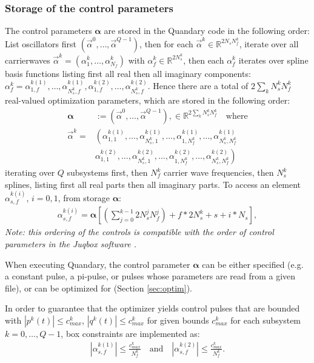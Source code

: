 \documentclass[11pt]{article}
\newcommand{\R}{\mathds{R}}
\newcommand{\bfa}{\boldsymbol{\alpha}}
\newcommand{\bs}[1]{{\boldsymbol{#1}}}
\begin{document}
\subsubsection{Storage of the control parameters}

The control parameters $\bs{\alpha}$ are stored in the Quandary code in the following order: List oscillators first $(\vec{\alpha}^0, \dots, \vec{\alpha}^{Q-1})$, then for each $\vec{\alpha}^k \in
\R^{2N_sN_f^k}$, iterate over all carrierwaves $\vec{\alpha}^k =
(\alpha^k_1,\dots, \alpha^k_{N_f})$ with $\alpha^k_f \in \R^{2N_s^k}$, then each
$\alpha^k_f$ iterates over spline basis functions listing first all real then all imaginary 
components: $\alpha^k_f = \alpha^{k(1)}_{1,f}, \dots, \alpha^{k(1)}_{N_s^k,f}, \alpha^{k(2)}_{1,f}, \dots, \alpha^{k(2)}_{N_s^k,f}$. Hence there are a total of $2\sum_k N_s^kN_f^k$ real-valued optimization parameters, which are stored in the following order:
  \begin{align}
    \boldsymbol{\alpha} &:= \left( \vec{\alpha}^0, \dots, \vec{\alpha}^{Q-1} \right), \in
    \mathds{R}^{2\sum_k N_s^k N_f^k} \quad \text{where}\\
    \vec{\alpha}^k = &\left( \alpha_{1,1}^{k(1)},\dots, \alpha_{N_s^k,1}^{k(1)}, \dots, \alpha_{1,N_f^k}^{k(1)}, \dots, \alpha_{N_s^k,N_f^k}^{k(1)} \right.\\
                   &  \left. \alpha_{1,1}^{k(2)},\dots, \alpha_{N_s^k,1}^{k(2)}, \dots, \alpha_{1,N_f^k}^{k(2)}, \dots, \alpha_{N_s^k,N_f^k}^{k(2)} \right)
  \end{align}
  iterating over $Q$ subsystems first, then $N_f^k$ carrier wave frequencies, then $N_s^k$ splines, listing first all real parts then all imaginary parts. To access an element $\alpha_{s,f}^{k(i)}$, $i=0,1$, from storage $\bfa$:
  \begin{align}
    \alpha_{s,f}^{k(i)} = \bfa[ \left(\sum_{j=0}^{k-1} 2N_s^jN_f^j\right) + f*2N_s^k + s + i*N_s ],
  \end{align}
  \textit{Note: this ordering of the controls is compatible with the order of control parameters in the Juqbox software \cite{petersson2021optimal}.}

  When executing Quandary, the control parameter $\boldsymbol{\alpha}$ can be either specified (e.g. a constant pulse, a pi-pulse, or 
  pulses whose parameters are read from a given file), or can be optimized for (Section \ref{sec:optim}). 
  
  In order to guarantee that the optimizer yields control pulses that are
  bounded with $|p^k(t)| \leq c^k_{max}$, $|q^k(t)| \leq c^k_{max}$ for given bounds $c^k_{max}$ for each  
  subsystem $k=0,\dots, Q-1$, box constraints are implemented as:
   \begin{align}
     | \alpha_{s,f}^{k(1)}| \leq \frac{c^k_{max}}{N_f^k} \quad \text{and} \quad |
     \alpha_{s,f}^{k(2)} | \leq \frac{c^k_{max}}{N_f^k}.
   \end{align}
\end{document}
